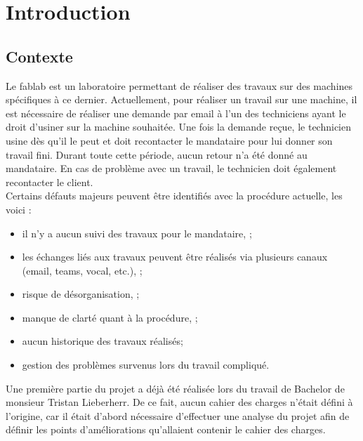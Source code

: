 \documentclass[
    iai, %
    il, %
]{heig-tb}
\begin{document}
\maketitle
\frontmatter
\clearemptydoublepage

\preamble
\authentification

\begin{abstract}
    
\end{abstract}

\clearemptydoublepage
{
    \tableofcontents
    \let\cleardoublepage\clearpage
    \listoffigures
    \let\cleardoublepage\clearpage
    \listoftables
    \let\cleardoublepage\clearpage
    \listoflistings
}

\printnomenclature
\clearemptydoublepage
{}

\mainmatter

\chapter{Introduction}

\section{Contexte}
Le \Gls{fablab} est un laboratoire permettant de réaliser des travaux sur des machines spécifiques à ce dernier. Actuellement, pour réaliser un travail sur une machine, il est nécessaire de réaliser une demande par email à l'un des techniciens ayant le droit d'usiner sur la machine souhaitée. Une fois la demande reçue, le technicien usine dès qu'il le peut et doit recontacter le mandataire pour lui donner son travail fini. Durant toute cette période, aucun retour n'a été donné au mandataire. En cas de problème avec un travail, le technicien doit également recontacter le client.\\
Certains défauts majeurs peuvent être identifiés avec la procédure actuelle, les voici :
\begin{itemize}
    \item il n'y a aucun suivi des travaux pour le mandataire, \cite{lieberherr};
    \item les échanges liés aux travaux peuvent être réalisés via plusieurs canaux (email, \Gls{teams}, vocal, etc.), \cite{lieberherr};
    \item risque de désorganisation, \cite{lieberherr};
    \item manque de clarté quant à la procédure, \cite{lieberherr};
    \item aucun historique des travaux réalisés;
    \item gestion des problèmes survenus lors du travail compliqué.
\end{itemize}
Une première partie du projet a déjà été réalisée lors du travail de Bachelor de monsieur Tristan Lieberherr. De ce fait, aucun cahier des charges n'était défini à l'origine, car il était d'abord nécessaire d'effectuer une analyse du projet afin de définir les points d'améliorations qu'allaient contenir le cahier des charges.
\end{document}
